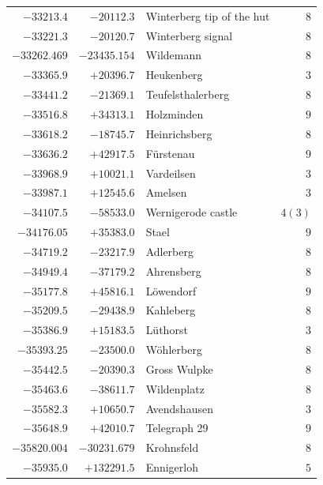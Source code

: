 \begin{center}
\begin{tabular}{r|r|p{170pt}|r}
\(-33213.4\)&\(-20112.3\)&Winterberg tip of the hut&\(8\)\\
\(-33221.3\)&\(-20120.7\)&Winterberg signal&\(8\)\\
\(-33262.469\)&\(-23435.154\)&Wildemann&\(8\)\\
\(-33365.9\)&\(+20396.7\)&Heukenberg&\(3\)\\
\(-33441.2\)&\(-21369.1\)&Teufelsthalerberg&\(8\)\\
\(-33516.8\)&\(+34313.1\)&Holzminden&\(9\)\\
\(-33618.2\)&\(-18745.7\)&Heinrichsberg&\(8\)\\
\(-33636.2\)&\(+42917.5\)&Fürstenau&\(9\)\\
\(-33968.9\)&\(+10021.1\)&Vardeilsen&\(3\)\\
\(-33987.1\)&\(+12545.6\)&Amelsen&\(3\)\\
\(-34107.5\)&\(-58533.0\)&Wernigerode castle&\(4 (3)\)\\
\(-34176.05\)&\(+35383.0\)&Stael&\(9\)\\
\(-34719.2\)&\(-23217.9\)&Adlerberg&\(8\)\\
\(-34949.4\)&\(-37179.2\)&Ahrensberg&\(8\)\\
\(-35177.8\)&\(+45816.1\)&Löwendorf&\(9\)\\
\(-35209.5\)&\(-29438.9\)&Kahleberg&\(8\)\\
\(-35386.9\)&\(+15183.5\)&Lüthorst&\(3\)\\
\(-35393.25\)&\(-23500.0\)&Wöhlerberg&\(8\)\\
\(-35442.5\)&\(-20390.3\)&Gross Wulpke&\(8\)\\
\(-35463.6\)&\(-38611.7\)&Wildenplatz&\(8\)\\
\(-35582.3\)&\(+10650.7\)&Avendshausen&\(3\)\\
\(-35648.9\)&\(+42010.7\)&Telegraph 29&\(9\)\\
\(-35820.004\)&\(-30231.679\)&Krohnsfeld&\(8\)\\
\(-35935.0\)&\(+132291.5\)&Ennigerloh&\(5\)\\
\hline\end{tabular}\endgroup\end{center}
